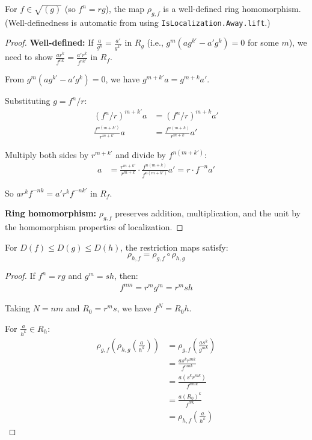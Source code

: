 \begin{lemma}
  \label{lemma:restriction-maps-well-defined}
  \leanok
  For $f \in \sqrt{(g)}$ (so $f^n = rg$), the map $\rho_{g,f}$ is a well-defined ring homomorphism.
  (Well-definedness is automatic from using \texttt{IsLocalization.Away.lift}.)
\end{lemma}

\begin{proof}
  \textbf{Well-defined:} If $\frac{a}{g^k} = \frac{a'}{g^{k'}}$ in $R_g$ (i.e., $g^m(a g^{k'} - a' g^k) = 0$ for some $m$),
  we need to show $\frac{ar^k}{f^{nk}} = \frac{a'r^k}{f^{nk'}}$ in $R_f$.
  
  From $g^m(ag^{k'} - a'g^k) = 0$, we have $g^{m+k'}a = g^{m+k}a'$.
  
  Substituting $g = f^n/r$:
  \begin{align*}
    (f^n/r)^{m+k'} a &= (f^n/r)^{m+k} a' \\
    \frac{f^{n(m+k')}}{r^{m+k'}} a &= \frac{f^{n(m+k)}}{r^{m+k}} a'
  \end{align*}
  
  Multiply both sides by $r^{m+k'}$ and divide by $f^{n(m+k')}$:
  \begin{align*}
    a &= \frac{r^{m+k'}}{r^{m+k}} \cdot \frac{f^{n(m+k)}}{f^{n(m+k')}} a' = r \cdot f^{-n} a'
  \end{align*}
  
  So $ar^k f^{-nk} = a' r^k f^{-nk'}$ in $R_f$.
  
  \textbf{Ring homomorphism:} $\rho_{g,f}$ preserves addition, multiplication, and the unit by the homomorphism properties of localization.
\end{proof}

\begin{lemma}
  \label{lemma:restriction-compose}
  \leanok
  For $D(f) \leq D(g) \leq D(h)$, the restriction maps satisfy:
  $$\rho_{h,f} = \rho_{g,f} \circ \rho_{h,g}$$
\end{lemma}

\begin{proof}
  \leanok
  If $f^n = rg$ and $g^m = sh$, then:
  \begin{align*}
    f^{nm} = r^m g^m = r^m s h
  \end{align*}
  
  Taking $N = nm$ and $R_0 = r^m s$, we have $f^N = R_0 h$.
  
  For $\frac{a}{h^k} \in R_h$:
  \begin{align*}
    \rho_{g,f}(\rho_{h,g}(\frac{a}{h^k})) &= \rho_{g,f}(\frac{as^k}{g^{mk}}) \\
    &= \frac{as^k r^{mk}}{f^{nmk}} \\
    &= \frac{a(s^k r^{mk})}{f^{nmk}} \\
    &= \frac{a(R_0)^k}{f^{Nk}}\\
    &= \rho_{h,f}(\frac{a}{h^k})
  \end{align*}
\end{proof}

